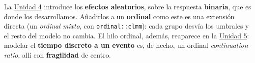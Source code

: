 \documentclass[
  letterpaper,
  DIV=11,
  numbers=noendperiod]{scrartcl}
\begin{document}
\begin{tcolorbox}[enhanced jigsaw, breakable, colframe=quarto-callout-note-color-frame, left=2mm, arc=.35mm, colbacktitle=quarto-callout-note-color!10!white, toprule=.15mm, colback=white, coltitle=black, rightrule=.15mm, opacitybacktitle=0.6, title=\textcolor{quarto-callout-note-color}{\faInfo}\hspace{0.5em}{Puente a la Unidad 4}, titlerule=0mm, toptitle=1mm, bottomtitle=1mm, leftrule=.75mm, bottomrule=.15mm, opacityback=0]

La \protect\hyperlink{sec-u14}{Unidad 4} introduce los \textbf{efectos
aleatorios}, sobre la respuesta \textbf{binaria}, que es donde los
desarrollamos. Añadirlos a un \textbf{ordinal} como este es una
extensión directa (un \emph{ordinal mixto}, con \texttt{ordinal::clmm}):
cada grupo desvía los umbrales y el resto del modelo no cambia. El hilo
ordinal, además, reaparece en la \protect\hyperlink{sec-u15}{Unidad 5}:
modelar el \textbf{tiempo discreto a un evento} es, de hecho, un ordinal
\emph{continuation-ratio}, allí con \textbf{fragilidad} de centro.

\end{tcolorbox}
\end{document}
